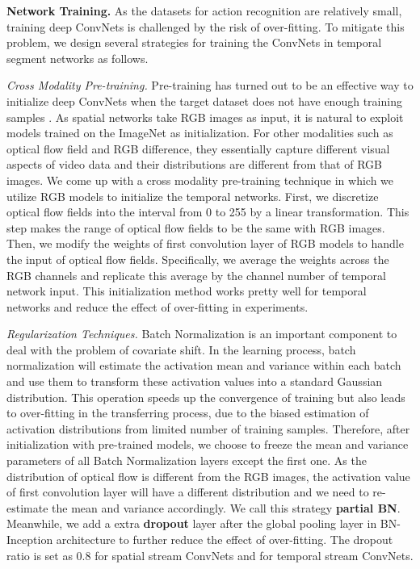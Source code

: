 \documentclass[runningheads]{llncs}
\newcommand{\SEGNET}{temporal segment network}
\begin{document}
\textbf{Network Training.}
As the datasets for action recognition are relatively small, training deep ConvNets is challenged by the risk of over-fitting. 
To mitigate this problem, we design several strategies for training the ConvNets in \SEGNET s as follows.

\textit{Cross Modality Pre-training.} 
Pre-training has turned out to be an effective way to initialize deep ConvNets when the target dataset does not have enough training samples \cite{SimonyanZ14}. As spatial networks take RGB images as input, it is natural to exploit models trained on the ImageNet \cite{DengDSLL009} as initialization. For other modalities such as optical flow field and RGB difference, they essentially capture different visual aspects of video data and their distributions are different from that of RGB images. We come up with a cross modality pre-training technique in which we utilize RGB models to initialize the temporal networks. First, we discretize optical flow fields into the interval from 0 to 255 by a linear transformation. This step makes the range of optical flow fields to be the same with RGB images. Then, we modify the weights of first convolution layer of RGB models to handle the input of optical flow fields. Specifically, we average the weights across the RGB channels and replicate this average by the channel number of temporal network input. This initialization method works pretty well for temporal networks and reduce the effect of over-fitting in experiments.

\textit{Regularization Techniques.} 
Batch Normalization \cite{IoffeS15} is an important component to deal with the problem of covariate shift. In the learning process, batch normalization will estimate the activation mean and variance within each batch and use them to transform these activation values into a standard Gaussian distribution. This operation speeds up the convergence of training but also leads to over-fitting in the transferring process, due to the biased estimation of activation distributions from limited number of training samples. Therefore, after initialization with pre-trained models, we choose to freeze the mean and variance parameters of all Batch Normalization layers except the first one. As the distribution of optical flow is different from the RGB images, the activation value of first convolution layer will have a different distribution and we need to re-estimate the mean and variance accordingly. We call this strategy \textbf{partial BN}.
Meanwhile, we add a extra \textbf{dropout} layer after the global pooling layer in BN-Inception architecture to further reduce the effect of over-fitting. The dropout ratio is set as 0.8 for spatial stream ConvNets and  for temporal stream ConvNets.
\end{document}
